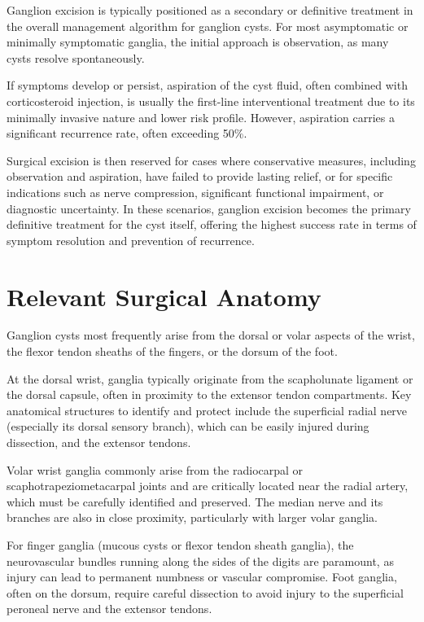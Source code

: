 Ganglion excision is typically positioned as a secondary or definitive treatment in the overall management algorithm for ganglion cysts. For most asymptomatic or minimally symptomatic ganglia, the initial approach is observation, as many cysts resolve spontaneously. 

If symptoms develop or persist, aspiration of the cyst fluid, often combined with corticosteroid injection, is usually the first-line interventional treatment due to its minimally invasive nature and lower risk profile. However, aspiration carries a significant recurrence rate, often exceeding 50\%. 

Surgical excision is then reserved for cases where conservative measures, including observation and aspiration, have failed to provide lasting relief, or for specific indications such as nerve compression, significant functional impairment, or diagnostic uncertainty. In these scenarios, ganglion excision becomes the primary definitive treatment for the cyst itself, offering the highest success rate in terms of symptom resolution and prevention of recurrence.

\section*{Relevant Surgical Anatomy}
Ganglion cysts most frequently arise from the dorsal or volar aspects of the wrist, the flexor tendon sheaths of the fingers, or the dorsum of the foot. 

At the dorsal wrist, ganglia typically originate from the scapholunate ligament or the dorsal capsule, often in proximity to the extensor tendon compartments. Key anatomical structures to identify and protect include the superficial radial nerve (especially its dorsal sensory branch), which can be easily injured during dissection, and the extensor tendons. 

Volar wrist ganglia commonly arise from the radiocarpal or scaphotrapeziometacarpal joints and are critically located near the radial artery, which must be carefully identified and preserved. The median nerve and its branches are also in close proximity, particularly with larger volar ganglia.

For finger ganglia (mucous cysts or flexor tendon sheath ganglia), the neurovascular bundles running along the sides of the digits are paramount, as injury can lead to permanent numbness or vascular compromise. Foot ganglia, often on the dorsum, require careful dissection to avoid injury to the superficial peroneal nerve and the extensor tendons. 

